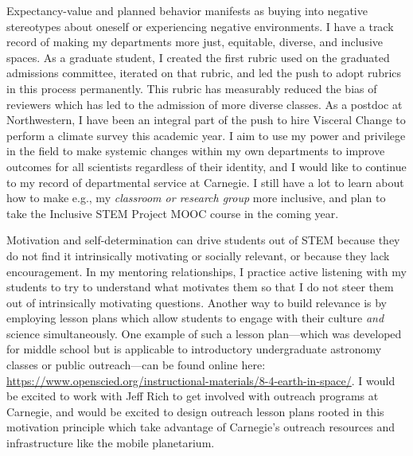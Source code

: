 \documentclass[11pt]{article}
\begin{document}
Expectancy-value and planned behavior manifests as buying into negative stereotypes about oneself or experiencing negative environments.
I have a track record of making my departments more just, equitable, diverse, and inclusive spaces.
As a graduate student, I created the first rubric used on the graduated admissions committee, iterated on that rubric, and led the push to adopt rubrics in this process permanently.
This rubric has measurably reduced the bias of reviewers which has led to the admission of more diverse classes.
As a postdoc at Northwestern, I have been an integral part of the push to hire Visceral Change to perform a climate survey this academic year.
I aim to use my power and privilege in the field to make systemic changes within my own departments to improve outcomes for all scientists regardless of their identity, and I would like to continue to my record of departmental service at Carnegie.
I still have a lot to learn about how to make e.g., my \emph{classroom or research group} more inclusive, and plan to take the Inclusive STEM Project MOOC course in the coming year.

Motivation and self-determination can drive students out of STEM because they do not find it intrinsically motivating or socially relevant, or because they lack encouragement.
In my mentoring relationships, I practice active listening \citep{jahromi_etal_2016} with my students to try to understand what motivates them so that I do not steer them out of intrinsically motivating questions.
Another way to build relevance is by employing lesson plans which allow students to engage with their culture \emph{and} science simultaneously.
One example of such a lesson plan---which was developed for middle school but is applicable to introductory undergraduate astronomy classes or public outreach---can be found online here: \url{https://www.openscied.org/instructional-materials/8-4-earth-in-space/}.
I would be excited to work with Jeff Rich to get involved with outreach programs at Carnegie, and would be excited to design outreach lesson plans rooted in this motivation principle which take advantage of Carnegie's outreach resources and infrastructure like the mobile planetarium.

\end{document}
